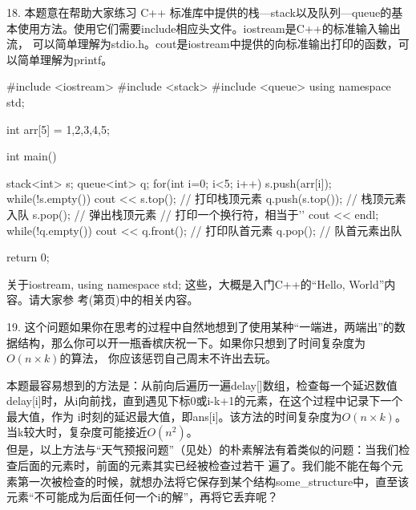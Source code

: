     \vspace{\baselineskip}

    18. 本题意在帮助大家练习 C++ 标准库中提供的栈---stack以及队列---queue的基本使用方法。使用它们需要include相应头文件。iostream是C++的标准输入输出流，
    可以简单理解为stdio.h。cout是iostream中提供的向标准输出打印的函数，可以简单理解为printf。
    \begin{cppcode}
        #include <iostream>
        #include <stack>
        #include <queue>
        using namespace std;

        int arr[5] = {1,2,3,4,5};

        int main() {
            stack<int> s;
            queue<int> q;
            for(int i=0; i<5; i++) {
                s.push(arr[i]);
            }
            while(!s.empty()) {
                cout << s.top();    // 打印栈顶元素
                q.push(s.top());    // 栈顶元素入队
                s.pop();    // 弹出栈顶元素
            }
            // 打印一个换行符，相当于'\n'
            cout << endl;
            while(!q.empty()) {
                cout << q.front();  // 打印队首元素
                q.pop();    // 队首元素出队
            }

            return 0;
        }

    \end{cppcode}
    关于iostream, using namespace std; 这些，大概是入门C++的“Hello, World”内容。请大家参
    考(第\pageref{sec:cpp-hello-world}页)中的相关内容。

    \vspace{\baselineskip}

    19. 这个问题如果你在思考的过程中自然地想到了使用某种“一端进，两端出”的数据结构，那么你可以开一瓶香槟庆祝一下。如果你只想到了时间复杂度为\(O(n\times k)\)的算法，
    你应该惩罚自己周末不许出去玩。

    本题最容易想到的方法是：从前向后遍历一遍delay[]数组，检查每一个延迟数值delay[i]时，从i向前找，直到遇见下标0或i-k+1的元素，在这个过程中记录下一个最大值，作为
    i时刻的延迟最大值，即ans[i]。该方法的时间复杂度为\(O(n\times k)\)。当k较大时，复杂度可能接近\(O(n^2)\)。\\

    但是，以上方法与“天气预报问题”（见处）的朴素解法有着类似的问题：当我们检查后面的元素时，前面的元素其实已经被检查过若干
    遍了。我们能不能在每个元素第一次被检查的时候，就想办法将它保存到某个结构some\_structure中，直至该元素“不可能成为后面任何一个i的解”，再将它丢弃呢？\\

